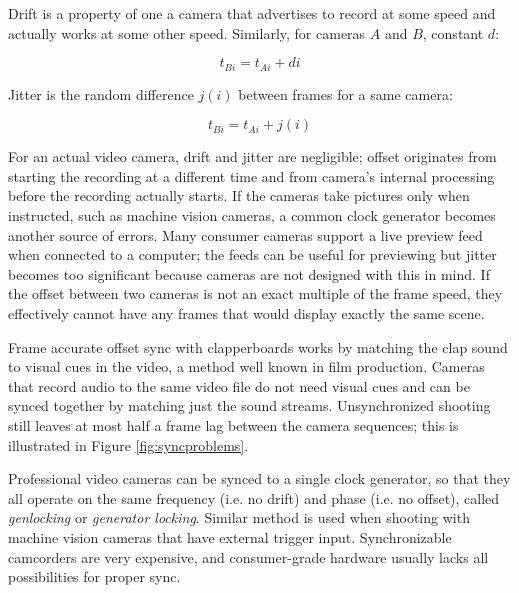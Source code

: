 Drift is a property of one a camera that advertises to record at some speed and actually works at some other speed. Similarly, for cameras $A$ and $B$, constant $d$:

\begin{equation} \label{eq:timedrift}
	t_{Bi} = t_{Ai} + d i
\end{equation}

Jitter is the random difference $j(i)$ between frames for a same camera:

\begin{equation} \label{eq:timejitter}
	t_{Bi} = t_{Ai} + j(i)
\end{equation}

For an actual video camera, drift and jitter are negligible; offset originates from starting the recording at a different time and from camera's internal processing before the recording actually starts.
If the cameras take pictures only when instructed, such as machine vision cameras, a common clock generator becomes another source of errors.
Many consumer cameras support a live preview feed when connected to a computer; the feeds can be useful for previewing but jitter becomes too significant because cameras are not designed with this in mind.
If the offset between two cameras is not an exact multiple of the frame speed, they effectively cannot have any frames that would display exactly the same scene.

Frame accurate offset sync with clapperboards works by matching the clap sound to visual cues in the video, a method well known in film production.
Cameras that record audio to the same video file do not need visual cues and can be synced together by matching just the sound streams.
Unsynchronized shooting still leaves at most half a frame lag between the camera sequences; this is illustrated in Figure \ref{fig:syncproblems}.

Professional video cameras can be synced to a single clock generator, so that they all operate on the same frequency (i.e. no drift) and phase (i.e. no offset), called \emph{genlocking} or \emph{generator locking}.
Similar method is used when shooting with machine vision cameras that have external trigger input.
Synchronizable camcorders are very expensive, and consumer-grade hardware usually lacks all possibilities for proper sync.

%
%
%
%

